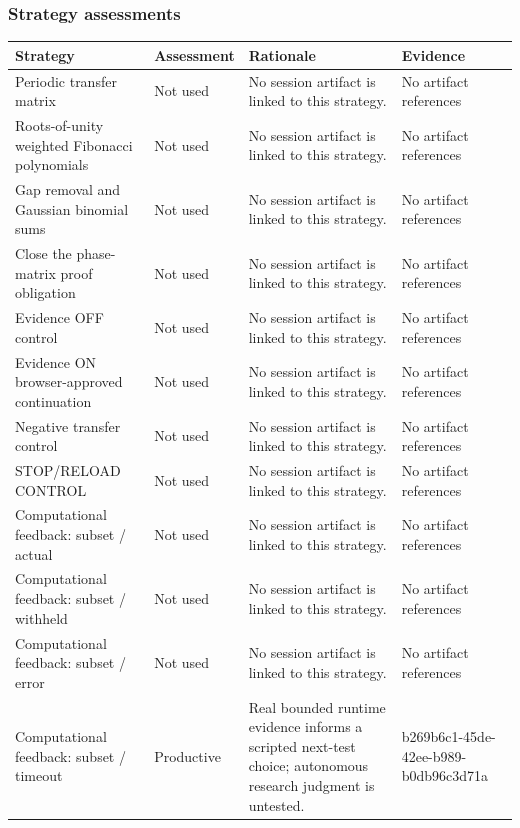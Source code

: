 \documentclass[11pt]{article}
\begin{document}
\subsubsection*{Strategy assessments}
\begin{longtable}{>{\raggedright\arraybackslash}p{.16\linewidth}>{\raggedright\arraybackslash}p{.15\linewidth}>{\raggedright\arraybackslash}p{.40\linewidth}>{\raggedright\arraybackslash}p{.17\linewidth}}
\toprule Strategy & Assessment & Rationale & Evidence \\
\midrule\endhead
Periodic transfer matrix & Not used & No session artifact is linked to this strategy. & No artifact references \\
Roots-of-unity weighted Fibonacci polynomials & Not used & No session artifact is linked to this strategy. & No artifact references \\
Gap removal and Gaussian binomial sums & Not used & No session artifact is linked to this strategy. & No artifact references \\
Close the phase-matrix proof obligation & Not used & No session artifact is linked to this strategy. & No artifact references \\
Evidence OFF control & Not used & No session artifact is linked to this strategy. & No artifact references \\
Evidence ON browser-approved continuation & Not used & No session artifact is linked to this strategy. & No artifact references \\
Negative transfer control & Not used & No session artifact is linked to this strategy. & No artifact references \\
STOP/RELOAD CONTROL & Not used & No session artifact is linked to this strategy. & No artifact references \\
Computational feedback: subset / actual & Not used & No session artifact is linked to this strategy. & No artifact references \\
Computational feedback: subset / withheld & Not used & No session artifact is linked to this strategy. & No artifact references \\
Computational feedback: subset / error & Not used & No session artifact is linked to this strategy. & No artifact references \\
Computational feedback: subset / timeout & Productive & Real bounded runtime evidence informs a scripted next-test choice; autonomous research judgment is untested. & b269b6c1-45de-42ee-b989-b0db96c3d71a \\
\bottomrule
\end{longtable}
\end{document}
